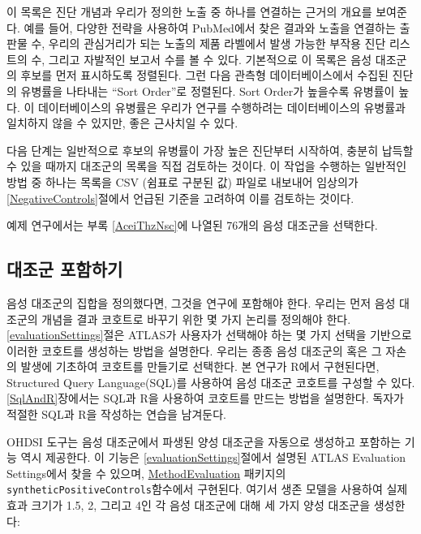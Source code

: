 \documentclass[10.5pt]{book}
\theoremstyle{definition}
\theoremstyle{definition}
\theoremstyle{definition}
\theoremstyle{remark}
\begin{document}
이 목록은 진단 개념과 우리가 정의한 노출 중 하나를 연결하는 근거의
개요를 보여준다. 예를 들어, 다양한 전략을 사용하여 PubMed에서 찾은
결과와 노출을 연결하는 출판물 수, 우리의 관심거리가 되는 노출의 제품
라벨에서 발생 가능한 부작용 진단 리스트의 수, 그리고 자발적인 보고서
수를 볼 수 있다. 기본적으로 이 목록은 음성 대조군의 후보를 먼저
표시하도록 정렬된다. 그런 다음 관측형 데이터베이스에서 수집된 진단의
유병률을 나타내는 ``Sort Order''로 정렬된다. Sort Order가 높을수록
유병률이 높다. 이 데이터베이스의 유병률은 우리가 연구를 수행하려는
데이터베이스의 유병률과 일치하지 않을 수 있지만, 좋은 근사치일 수 있다.

다음 단계는 일반적으로 후보의 유병률이 가장 높은 진단부터 시작하여,
충분히 납득할 수 있을 때까지 대조군의 목록을 직접 검토하는 것이다. 이
작업을 수행하는 일반적인 방법 중 하나는 목록을 CSV (쉼표로 구분된 값)
파일로 내보내어 임상의가 \ref{NegativeControls}절에서 언급된 기준을
고려하여 이를 검토하는 것이다.

예제 연구에서는 부록 \ref{AceiThzNsc}에 나열된 76개의 음성 대조군을
선택한다.

\subsection{대조군 포함하기}\label{-}

음성 대조군의 집합을 정의했다면, 그것을 연구에 포함해야 한다. 우리는
먼저 음성 대조군의 개념을 결과 코호트로 바꾸기 위한 몇 가지 논리를
정의해야 한다. \ref{evaluationSettings}절은 ATLAS가 사용자가 선택해야
하는 몇 가지 선택을 기반으로 이러한 코호트를 생성하는 방법을 설명한다.
우리는 종종 음성 대조군의 혹은 그 자손의 발생에 기초하여 코호트를
만들기로 선택한다. 본 연구가 R에서 구현된다면, Structured Query
Language(SQL)를 사용하여 음성 대조군 코호트를 구성할 수 있다.
\ref{SqlAndR}장에서는 SQL과 R을 사용하여 코호트를 만드는 방법을
설명한다. 독자가 적절한 SQL과 R을 작성하는 연습을 남겨둔다.

OHDSI 도구는 음성 대조군에서 파생된 양성 대조군을 자동으로 생성하고
포함하는 기능 역시 제공한다. 이 기능은 \ref{evaluationSettings}절에서
설명된 ATLAS Evaluation Settings에서 찾을 수 있으며,
\href{https://ohdsi.github.io/MethodEvaluation/}{MethodEvaluation}
패키지의 \texttt{syntheticPositiveControls}함수에서 구현된다. 여기서
생존 모델을 사용하여 실제 효과 크기가 1.5, 2, 그리고 4인 각 음성
대조군에 대해 세 가지 양성 대조군을 생성한다:
\end{document}
